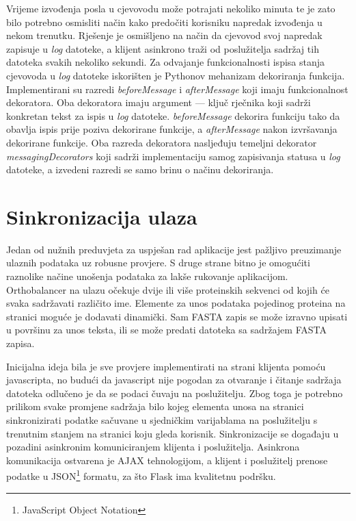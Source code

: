     
Vrijeme izvođenja posla u cjevovodu može potrajati nekoliko minuta te je zato
bilo potrebno osmisliti način kako predočiti korisniku napredak izvođenja u
nekom trenutku. Rješenje je osmišljeno na način da cjevovod svoj napredak
zapisuje u \emph{log} datoteke, a klijent asinkrono traži od poslužitelja
sadržaj tih datoteka svakih nekoliko sekundi. Za odvajanje funkcionalnosti
ispisa stanja cjevovoda u \emph{log} datoteke iskorišten je Pythonov mehanizam
dekoriranja funkcija. Implementirani su razredi \emph{beforeMessage} i
\emph{afterMessage} koji imaju funkcionalnost dekoratora. Oba dekoratora imaju
argument --- ključ rječnika koji sadrži konkretan tekst za ispis u \emph{log}
datoteke. \emph{beforeMessage} dekorira funkciju tako da obavlja ispis prije
poziva dekorirane funkcije, a \emph{afterMessage} nakon izvršavanja dekorirane
funkcije. Oba razreda dekoratora nasljeđuju temeljni dekorator
\emph{messagingDecorators} koji sadrži implementaciju samog zapisivanja statusa
u \emph{log} datoteke, a izvedeni razredi se samo brinu o načinu dekoriranja.



\section{Sinkronizacija ulaza}
\label{sec:input}


Jedan od nužnih preduvjeta za uspješan rad aplikacije jest pažljivo preuzimanje
ulaznih podataka uz robusne provjere. S druge strane bitno je omogućiti
raznolike načine unošenja podataka za lakše rukovanje aplikacijom. Orthobalancer
na ulazu očekuje dvije ili više proteinskih sekvenci od kojih će svaka
sadržavati različito ime. Elemente za unos podataka pojedinog proteina na
stranici moguće je dodavati dinamički. Sam FASTA zapis se može izravno upisati u
površinu za unos teksta, ili se može predati datoteka sa sadržajem FASTA zapisa.

Inicijalna ideja bila je sve provjere implementirati na strani klijenta pomoću
javascripta, no budući da javascript nije pogodan za otvaranje i čitanje
sadržaja datoteka odlučeno je da se podaci čuvaju na poslužitelju. Zbog toga je
potrebno prilikom svake promjene sadržaja bilo kojeg elementa unosa na stranici
sinkronizirati podatke sačuvane u sjedničkim varijablama na poslužitelju s
trenutnim stanjem na stranici koju gleda korisnik. Sinkronizacije se događaju u
pozadini asinkronim komuniciranjem klijenta i poslužitelja. Asinkrona
komunikacija ostvarena je AJAX tehnologijom, a klijent i poslužitelj prenose
podatke u JSON\footnote{JavaScript Object Notation} formatu, za što Flask ima
kvalitetnu podršku.

